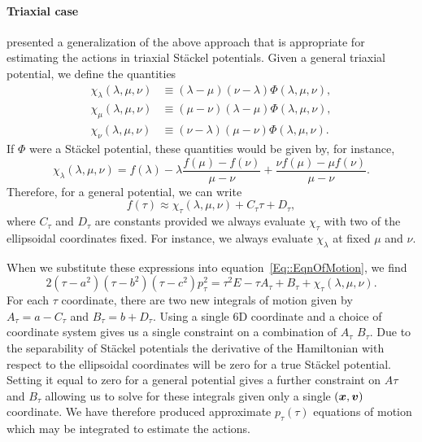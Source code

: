 \documentclass[useAMS,usenatbib,fleqn,a4paper]{mn2e}
\newcommand{\bs}[1]{\bmath{#1}}
\begin{document}
\paragraph{Triaxial case}\label{Method::SF_Triax}
\cite{SandersBinney2015} presented a generalization of the above approach that is appropriate for estimating the actions in triaxial St\"ackel potentials. Given a general triaxial potential, we define the quantities
\begin{equation}
\begin{split}
\chi_\lambda(\lambda,\mu,\nu) &\equiv (\lambda-\mu)(\nu-\lambda)\Phi(\lambda,\mu,\nu),\\
\chi_\mu(\lambda,\mu,\nu) &\equiv (\mu-\nu)(\lambda-\mu)\Phi(\lambda,\mu,\nu),\\
\chi_\nu(\lambda,\mu,\nu) &\equiv (\nu-\lambda)(\mu-\nu)\Phi(\lambda,\mu,\nu).
\end{split}
\end{equation}
If $\Phi$ were a St\"ackel potential, these quantities would be given by, for instance,
\begin{equation}
\chi_\lambda(\lambda,\mu,\nu) = f(\lambda)-\lambda\frac{f(\mu)-f(\nu)}{\mu-\nu}+\frac{\nu f(\mu)-\mu f(\nu)}{\mu-\nu}.
\end{equation}
Therefore, for a general potential, we can write
\begin{equation}
f(\tau) \approx \chi_\tau(\lambda,\mu,\nu)+C_\tau\tau+D_\tau,
\end{equation}
where $C_\tau$ and $D_\tau$ are constants provided we always evaluate $\chi_\tau$ with two of the ellipsoidal coordinates fixed. For instance, we always evaluate $\chi_\lambda$ at fixed $\mu$ and $\nu$.

When we substitute these expressions into equation~\eqref{Eq::EqnOfMotion}, we find
\begin{equation}
2(\tau-a^2)(\tau-b^2)(\tau-c^2)p_\tau^2=\tau^2 E -\tau A_\tau+B_\tau +\chi_\tau(\lambda,\mu,\nu).
\label{Eq::EqnOfMotion_JK}
\end{equation}
For each $\tau$ coordinate, there are two new integrals of motion given by $A_\tau=a-C_\tau$ and $B_\tau=b+D_\tau$. Using a single 6D coordinate and a choice of coordinate system gives us a single constraint on a combination of $A_\tau$ $B_\tau$. Due to the separability of St\"ackel potentials the derivative of the Hamiltonian with respect to the ellipsoidal coordinates will be zero for a true St\"ackel potential. Setting it equal to zero for a general potential gives a further constraint on $A\tau$ and $B_\tau$ allowing us to solve for these integrals given only a single $(\bs{x},\bs{v})$ coordinate. We have therefore produced approximate $p_\tau(\tau)$ equations of motion which may be integrated to estimate the actions.
\end{document}
